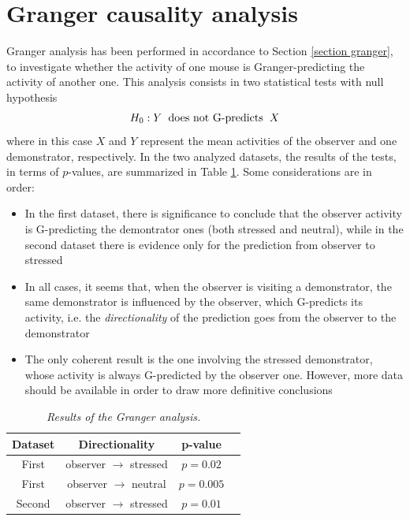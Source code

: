 \documentclass[12pt, a4paper]{report}
\begin{document}
\section{Granger causality analysis}

Granger analysis has been performed in accordance to Section \ref{section granger}, to investigate whether the activity of one mouse is Granger-predicting the activity of another one. This analysis consists in two statistical tests with null hypothesis
$$ H_0:  Y \hspace{0.2cm} \text{does not G-predicts} \hspace{0.2 cm} X $$
where in this case $X$ and $Y$ represent the mean activities of the observer and one demonstrator, respectively. In the two analyzed datasets, the results of the tests, in terms of $p$-values, are summarized in Table \ref{Granger table}. Some considerations are in order:

\begin{itemize}
	\item In the first dataset, there is significance to conclude that the observer activity is G-predicting the demontrator ones (both stressed and neutral), while in the second dataset there is evidence only for the prediction from observer to stressed
	
	\item In all cases, it seems that,  when the observer is visiting a demonstrator, the same demonstrator is influenced by the observer, which G-predicts its activity, i.e. the \textit{directionality} of the prediction goes from the observer to the demonstrator
	
	\item The only coherent result is the one involving the stressed demonstrator, whose activity is always G-predicted by the observer one. However, more data should be available in order to draw more definitive conclusions
\end{itemize}



\begin{table}[H]
	\begin{center}
		\begin{tabular}{ |c|c|c|c| } 
			\hline
			\textbf{Dataset} & \textbf{Directionality} & \textbf{p-value} \\
			\hline
			First & observer $\rightarrow$ stressed & $p = 0.02$ \\ 
			\hline
			First & observer $\rightarrow$ neutral & $p = 0.005$ \\
			\hline
			Second & observer $\rightarrow$ stressed & $p  =  0.01$ \\
			
			\hline
		\end{tabular}
		
	\end{center}
	\caption{\textit{Results of the Granger analysis.}} \label{Granger table}
\end{table}
\end{document}
